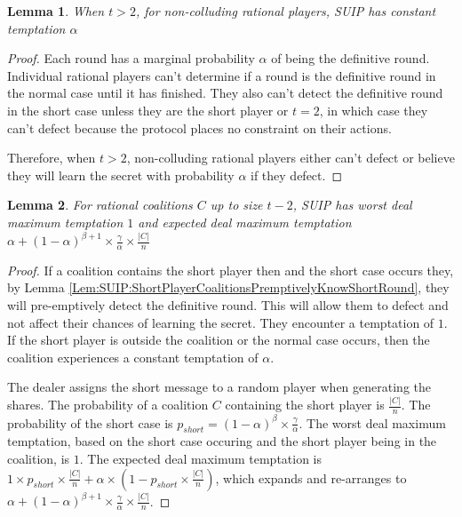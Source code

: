 \documentclass{dalcsthesis}
\newtheorem{lemma}{Lemma}
\begin{document}
\begin{lemma} When $t > 2$, for non-colluding rational players, SUIP has constant temptation $\alpha$ \label{Lem:SUIP:NonColludersNotTemptedExceptT2} \end{lemma}
\begin{proof}
Each round has a marginal probability $\alpha$ of being the definitive round. Individual rational players can't determine if a round is the definitive round in the normal case until it has finished. They also can't detect the definitive round in the short case unless they are the short player or $t=2$, in which case they can't defect because the protocol places no constraint on their actions.

Therefore, when $t > 2$, non-colluding rational players either can't defect or believe they will learn the secret with probability $\alpha$ if they defect.
\end{proof}

\begin{lemma} For rational coalitions $C$ up to size $t-2$, SUIP has worst deal maximum temptation $1$ and expected deal maximum temptation $\alpha + (1-\alpha)^{\beta+1} \times \frac{\gamma}{\alpha} \times \frac{|C|}{n}$ \label{Lem:SUIP:AllCoalitionsTempted} \end{lemma}
\begin{proof}
If a coalition contains the short player then and the short case occurs they, by Lemma \ref{Lem:SUIP:ShortPlayerCoalitionsPremptivelyKnowShortRound}, they will pre-emptively detect the definitive round. This will allow them to defect and not affect their chances of learning the secret. They encounter a temptation of $1$. If the short player is outside the coalition or the normal case occurs, then the coalition experiences a constant temptation of $\alpha$.

The dealer assigns the short message to a random player when generating the shares. The probability of a coalition $C$ containing the short player is $\frac{|C|}{n}$. The probability of the short case is $p_{short} = (1-\alpha)^\beta \times \frac{\gamma}{\alpha}$. The worst deal maximum temptation, based on the short case occuring and the short player being in the coalition, is $1$. The expected deal maximum temptation is $1 \times p_{short} \times \frac{|C|}{n} + \alpha \times (1 - p_{short} \times \frac{|C|}{n})$, which expands and re-arranges to $\alpha + (1-\alpha)^{\beta+1} \times \frac{\gamma}{\alpha} \times \frac{|C|}{n}$.
\end{proof}
\end{document}
